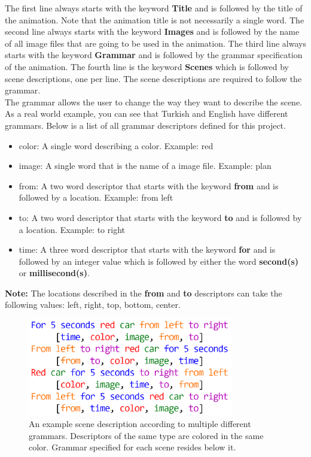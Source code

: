 \documentclass[a4paper]{article}
\begin{document}
	
	The first line always starts with the keyword \textbf{Title} and is followed by the title of the animation. Note that the animation title is not necessarily a single word. The second line always starts with the keyword \textbf{Images} and is followed by the name of all image files that are going to be used in the animation. The third line always starts with the keyword \textbf{Grammar} and is followed by the grammar specification of the animation. The fourth line is the keyword \textbf{Scenes} which is followed by scene descriptions, one per line. The scene descriptions are required to follow the grammar.\\
	
	The grammar allows the user to change the way they want to describe the scene. As a real world example, you can see that Turkish and English have different grammars. Below is a list of all grammar descriptors defined for this project.
	\label{grammar}
	\begin{itemize}
		\item color: A single word describing a color. Example: red
		\item image: A single word that is the name of a image file. Example: plan
		\item from: A two word descriptor that starts with the keyword \textbf{from} and is followed by a location. Example: from left
		\item to: A two word descriptor that starts with the keyword \textbf{to} and is followed by a location. Example: to right
		\item time: A three word descriptor that starts with the keyword \textbf{for} and is followed by an integer value which is followed by either the word \textbf{second(s)} or \textbf{millisecond(s)}.
	\end{itemize}

	\noindent \textbf{Note:} The locations described in the \textbf{from} and \textbf{to} descriptors can take the following values: left, right, top, bottom, center.
	
	\begin{figure}[!htb]
		\centering
		\includegraphics[width=0.8\textwidth]{../img/example_grammar.png}
		\caption{An example scene description according to multiple different grammars. Descriptors of the same type are colored in the same color. Grammar specified for each scene resides below it.}
	\end{figure}
	
\end{document}
